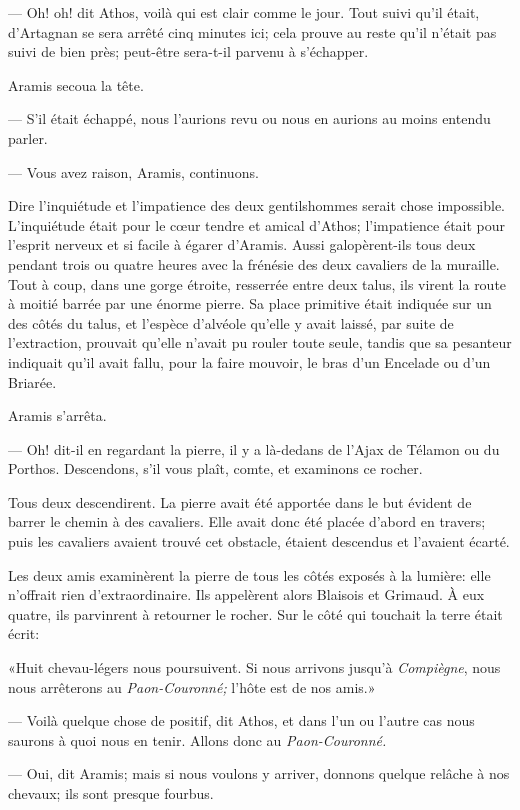 — Oh! oh! dit Athos, voilà qui est clair comme le jour. Tout suivi qu'il était, d'Artagnan se sera arrêté cinq minutes ici; cela prouve au reste qu'il n'était pas suivi de bien près; peut-être sera-t-il parvenu à s'échapper.

Aramis secoua la tête.

— S'il était échappé, nous l'aurions revu ou nous en aurions au moins entendu parler.

— Vous avez raison, Aramis, continuons.

Dire l'inquiétude et l'impatience des deux gentilshommes serait chose impossible. L'inquiétude était pour le cœur tendre et amical d'Athos; l'impatience était pour l'esprit nerveux et si facile à égarer d'Aramis. Aussi galopèrent-ils tous deux pendant trois ou quatre heures avec la frénésie des deux cavaliers de la muraille. Tout à coup, dans une gorge étroite, resserrée entre deux talus, ils virent la route à moitié barrée par une énorme pierre. Sa place primitive était indiquée sur un des côtés du talus, et l'espèce d'alvéole qu'elle y avait laissé, par suite de l'extraction, prouvait qu'elle n'avait pu rouler toute seule, tandis que sa pesanteur indiquait qu'il avait fallu, pour la faire mouvoir, le bras d'un Encelade ou d'un Briarée.

Aramis s'arrêta.

— Oh! dit-il en regardant la pierre, il y a là-dedans de l'Ajax de Télamon ou du Porthos. Descendons, s'il vous plaît, comte, et examinons ce rocher.

Tous deux descendirent. La pierre avait été apportée dans le but évident de barrer le chemin à des cavaliers. Elle avait donc été placée d'abord en travers; puis les cavaliers avaient trouvé cet obstacle, étaient descendus et l'avaient écarté.

Les deux amis examinèrent la pierre de tous les côtés exposés à la lumière: elle n'offrait rien d'extraordinaire. Ils appelèrent alors Blaisois et Grimaud. À eux quatre, ils parvinrent à retourner le rocher. Sur le côté qui touchait la terre était écrit:

«Huit chevau-légers nous poursuivent. Si nous arrivons jusqu'à \textit{Compiègne}, nous nous arrêterons au \textit{Paon-Couronné;} l'hôte est de nos amis.»

— Voilà quelque chose de positif, dit Athos, et dans l'un ou l'autre cas nous saurons à quoi nous en tenir. Allons donc au \textit{Paon-Couronné.}

— Oui, dit Aramis; mais si nous voulons y arriver, donnons quelque relâche à nos chevaux; ils sont presque fourbus.

